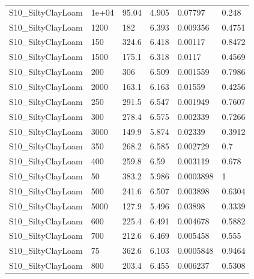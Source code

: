 {\begin{longtable}
{}S10\_SiltyClayLoam & 1e+04 & 95.04 & 4.905 & 0.07797 & 0.248\\
{}S10\_SiltyClayLoam & 1200 & 182 & 6.393 & 0.009356 & 0.4751\\
{}S10\_SiltyClayLoam & 150 & 324.6 & 6.418 & 0.00117 & 0.8472\\
{}S10\_SiltyClayLoam & 1500 & 175.1 & 6.318 & 0.0117 & 0.4569\\
{}S10\_SiltyClayLoam & 200 & 306 & 6.509 & 0.001559 & 0.7986\\
{}S10\_SiltyClayLoam & 2000 & 163.1 & 6.163 & 0.01559 & 0.4256\\
{}S10\_SiltyClayLoam & 250 & 291.5 & 6.547 & 0.001949 & 0.7607\\
{}S10\_SiltyClayLoam & 300 & 278.4 & 6.575 & 0.002339 & 0.7266\\
{}S10\_SiltyClayLoam & 3000 & 149.9 & 5.874 & 0.02339 & 0.3912\\
{}S10\_SiltyClayLoam & 350 & 268.2 & 6.585 & 0.002729 & 0.7\\
{}S10\_SiltyClayLoam & 400 & 259.8 & 6.59 & 0.003119 & 0.678\\
{}S10\_SiltyClayLoam & 50 & 383.2 & 5.986 & 0.0003898 & 1\\
{}S10\_SiltyClayLoam & 500 & 241.6 & 6.507 & 0.003898 & 0.6304\\
{}S10\_SiltyClayLoam & 5000 & 127.9 & 5.496 & 0.03898 & 0.3339\\
{}S10\_SiltyClayLoam & 600 & 225.4 & 6.491 & 0.004678 & 0.5882\\
{}S10\_SiltyClayLoam & 700 & 212.6 & 6.469 & 0.005458 & 0.555\\
{}S10\_SiltyClayLoam & 75 & 362.6 & 6.103 & 0.0005848 & 0.9464\\
{}S10\_SiltyClayLoam & 800 & 203.4 & 6.455 & 0.006237 & 0.5308\\
\bottomrule
\end{longtable}}

